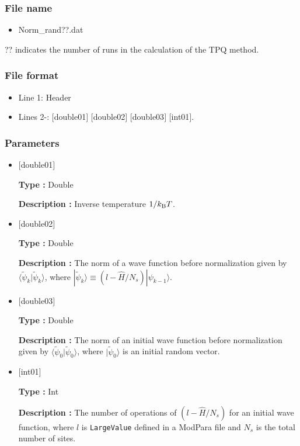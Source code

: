 \subsubsection{File name}
 \begin{itemize}
   \item Norm\_rand??.dat
  \end{itemize}
  ?? indicates the number of runs in the calculation of the TPQ method.

\subsubsection{File format}
 \begin{itemize}
   \item Line 1: Header
   \item Lines 2-: $[$double01$]$ $[$double02$]$ $[$double03$]$ $[$int01$]$.
  \end{itemize}
  
\subsubsection{Parameters}
 \begin{itemize}

  \item  $[$double01$]$
  
 {\bf Type :} Double

{\bf Description :}  Inverse temperature $1/{k_{\rm B}T}$.
 
  \item $[$double02$]$

 {\bf Type :} Double 

{\bf Description :}  The norm of a wave function before normalization 
given by $\langle \tilde{\psi}_{k} |\tilde{\psi}_{k}\rangle$, where $|\tilde{\psi}_{k}\rangle \equiv(l-\hat{H}/N_{s})|\psi_{k-1}\rangle$.


  \item $[$double03$]$

 {\bf Type :} Double 

{\bf Description :} The norm of an initial wave function before normalization 
given by $\langle \tilde{\psi}_{0} |\tilde{\psi}_{0}\rangle$, where $|\tilde{\psi}_{0}\rangle$ is an initial random vector.

  \item $[$int01$]$

 {\bf Type :} Int 

{\bf Description :} The number of operations of $(l-\hat{H}/N_{s})$ for an initial wave function, where $l$ is \verb|LargeValue| defined in a ModPara file and $N_{s}$ is the total number of sites.

 \end{itemize}

